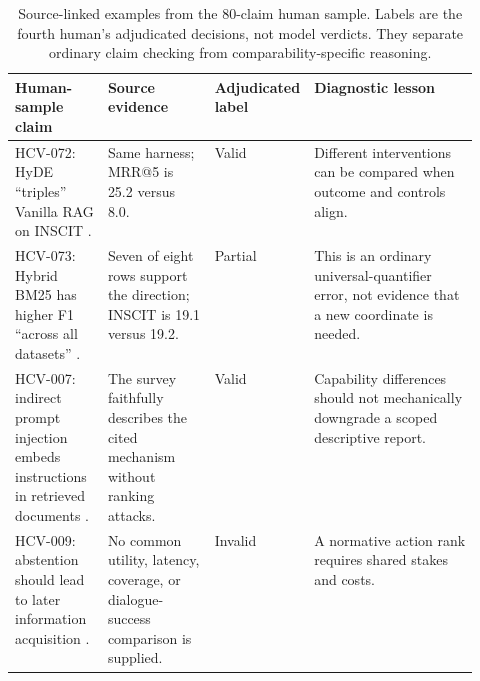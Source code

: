 \begin{table}[t]
\centering
\small
\renewcommand{\arraystretch}{0.95}
\begin{tabularx}{\linewidth}{>{\raggedright\arraybackslash}p{0.20\linewidth}>{\raggedright\arraybackslash}p{0.23\linewidth}>{\raggedright\arraybackslash}p{0.11\linewidth}X}
\toprule
\textbf{Human-sample claim} & \textbf{Source evidence} & \textbf{Adjudicated label} & \textbf{Diagnostic lesson} \\
\midrule
HCV-072: HyDE ``triples'' Vanilla RAG on INSCIT \citep{alushiRAGComparison2026}. & Same harness; MRR@5 is 25.2 versus 8.0. & Valid & Different interventions can be compared when outcome and controls align. \\
HCV-073: Hybrid BM25 has higher F1 ``across all datasets'' \citep{alushiRAGComparison2026}. & Seven of eight rows support the direction; INSCIT is 19.1 versus 19.2. & Partial & This is an ordinary universal-quantifier error, not evidence that a new coordinate is needed. \\
HCV-007: indirect prompt injection embeds instructions in retrieved documents \citep{trustRAGCompass2024}. & The survey faithfully describes the cited mechanism without ranking attacks. & Valid & Capability differences should not mechanically downgrade a scoped descriptive report. \\
HCV-009: abstention should lead to later information acquisition \citep{wenAbstentionSurvey2025}. & No common utility, latency, coverage, or dialogue-success comparison is supplied. & Invalid & A normative action rank requires shared stakes and costs. \\
\bottomrule
\end{tabularx}
\caption{Source-linked examples from the 80-claim human sample. Labels are the
fourth human's adjudicated decisions, not model verdicts. They separate
ordinary claim checking from comparability-specific reasoning.}
\label{tab:main-claim-audit-examples}
\end{table}
